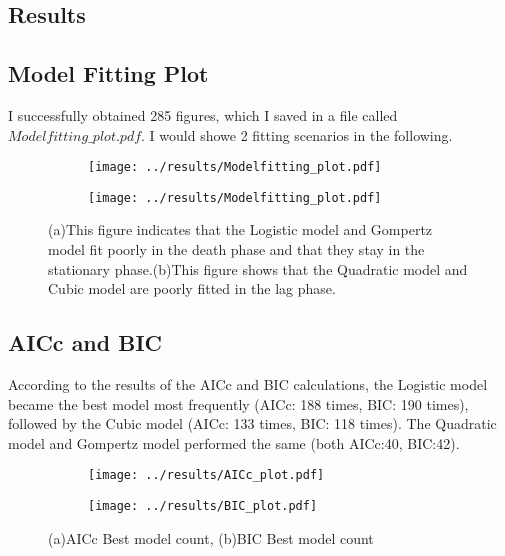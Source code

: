\documentclass[11pt]{article}
\begin{document}
\begin{linenumbers}
      \section{Results}

      \subsection{Model Fitting Plot}

    I successfully obtained 285 figures, which I saved in a file called $Modelfitting\_plot.pdf$. I would showe 2 fitting scenarios in the following.

     
      \begin{figure}[H]
        \centering
        \begin{subfigure}[a]{0.5\textwidth}
          \centering
          \texttt{[image: ../results/Modelfitting\_plot.pdf]}
          \caption{}
        \end{subfigure}
        \hfill
        \begin{subfigure}[a]{0.5\textwidth}
          \centering
          \texttt{[image: ../results/Modelfitting\_plot.pdf]}
          \caption{}
        \end{subfigure}
      \caption{(a)This figure indicates that the Logistic model and Gompertz model fit poorly in the death phase and that they stay in the stationary phase.(b)This figure shows that the Quadratic model and Cubic model are poorly fitted in the lag phase.}
      \end{figure}

      \newpage
      
      \subsection{AICc and BIC}
    According to the results of the AICc and BIC calculations, the Logistic model became the best model most frequently (AICc: 188 times, BIC: 190 times), followed by the Cubic model (AICc: 133 times, BIC: 118 times). The Quadratic model and Gompertz model performed the same (both AICc:40, BIC:42). 
    
      \begin{figure}[H]
        \centering
        \begin{subfigure}[a]{0.5\textwidth}
          \centering
          \texttt{[image: ../results/AICc\_plot.pdf]}
          \caption{}
        \end{subfigure}
        \hfill
        \begin{subfigure}[a]{0.5\textwidth}
          \centering
          \texttt{[image: ../results/BIC\_plot.pdf]}
          \caption{}
        \end{subfigure}
      \caption{(a)AICc Best model count, (b)BIC Best model count}  
      \end{figure}
      

\end{linenumbers}
\end{document}
